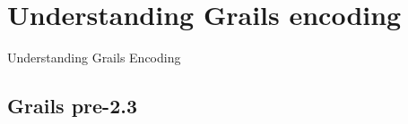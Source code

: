
\section{Understanding Grails encoding}

{
\begin{frame}[plain]
    \Huge\bfseries
    \vspace{-3.5cm}
    \begin{flushright}\color{white}Understanding Grails Encoding\end{flushright}
\end{frame}
}


\subsection{Grails pre-2.3}

